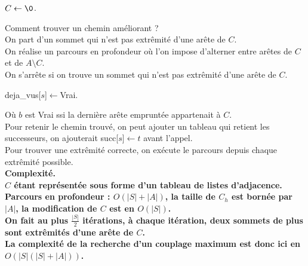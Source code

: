 \documentclass[french, 11pt]{article}
\begin{document}
\begin{defi}{}{}
    \begin{algorithm}[H]
        \caption{Couplage maximal.}
        $C\gets\0$.\\
    \end{algorithm}
\end{defi}

\begin{defi}{}{}
    Comment trouver un chemin améliorant ?\\
    On part d'un sommet qui n'est pas extrêmité d'une arête de $C$.\\
    On réalise un parcours en profondeur où l'on impose d'alterner entre arêtes de $C$ et de $A\setminus C$.\\
    On s'arrête si on trouve un sommet qui n'est pas extrêmité d'une arête de $C$.\\
    \begin{algorithm}[H] 
        \caption{Parcours}
        deja\_vus[$s$]$\gets$Vrai.\\
    \end{algorithm}
    Où $b$ est Vrai ssi la dernière arête empruntée appartenait à $C$.\\
    Pour retenir le chemin trouvé, on peut ajouter un tableau qui retient les successeurs, on ajouterait succ[$s$]$\gets t$ avant l'appel.\\
    Pour trouver une extrêmité correcte, on exécute le parcours depuis chaque extrêmité possible.\\
    \bf{Complexité.}\\
    $C$ étant représentée sous forme d'un tableau de listes d'adjacence.\\
    Parcours en profondeur : $O(|S|+|A|)$, la taille de $C_h$ est bornée par $|A|$, la modification de $C$ est en $O(|S|)$.\\
    On fait au plus $\frac{|S|}{2}$ itérations, à chaque itération, deux sommets de plus sont extrêmités d'une arête de $C$.\\
    La complexité de la recherche d'un couplage maximum est donc ici en $O(|S|(|S|+|A|))$. 
\end{defi}
\end{document}

